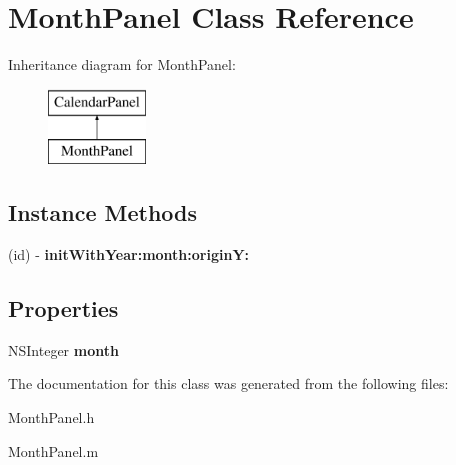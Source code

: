 \hypertarget{interface_month_panel}{\section{Month\+Panel Class Reference}
\label{interface_month_panel}
}
Inheritance diagram for Month\+Panel\+:\begin{figure}[H]
\begin{center}
\leavevmode
\includegraphics[height=2.000000cm]{interface_month_panel}
\end{center}
\end{figure}
\subsection*{Instance Methods}
\begin{DoxyCompactItemize}
\item 
\hypertarget{interface_month_panel_a81281be5f309c549595979d15ea23f1a}{(id) -\/ {\bfseries init\+With\+Year\+:month\+:origin\+Y\+:}}\label{interface_month_panel_a81281be5f309c549595979d15ea23f1a}

\end{DoxyCompactItemize}
\subsection*{Properties}
\begin{DoxyCompactItemize}
\item 
\hypertarget{interface_month_panel_af3fa55f0361f4a149e3a1267546e37d5}{N\+S\+Integer {\bfseries month}}\label{interface_month_panel_af3fa55f0361f4a149e3a1267546e37d5}

\end{DoxyCompactItemize}


The documentation for this class was generated from the following files\+:\begin{DoxyCompactItemize}
\item 
Month\+Panel.\+h\item 
Month\+Panel.\+m\end{DoxyCompactItemize}
